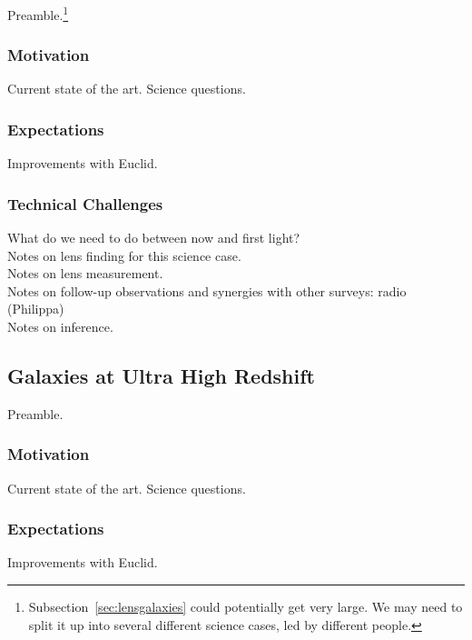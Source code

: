 \documentclass{article}
\begin{document}

Preamble.\footnote{Subsection~\ref{sec:lensgalaxies} could potentially get very large. We may need to split it up into several different science cases, led by different people.}

\subsubsection{Motivation}
Current state of the art. Science questions.\\

\subsubsection{Expectations}
Improvements with Euclid.\\

\subsubsection{Technical Challenges}
What do we need to do between now and first light?\\
Notes on lens finding for this science case.\\
Notes on lens measurement.\\
Notes on follow-up observations and synergies with other surveys: radio (Philippa) \\
Notes on inference.\\


\subsection{Galaxies at Ultra High Redshift}



Preamble.

\subsubsection{Motivation}
Current state of the art. Science questions.\\

\subsubsection{Expectations}
Improvements with Euclid.\\
\end{document}
